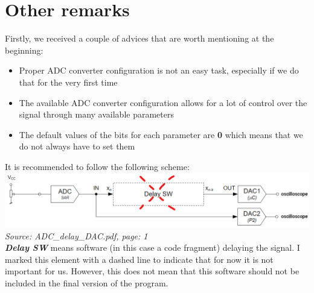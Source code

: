 \documentclass{article}
\begin{document}
\section{Other remarks}
Firstly, we received a couple of advices that are worth mentioning at the beginning:
\begin{itemize}
    \item Proper ADC converter configuration is not an easy task, especially if we do that for the very first time
    \item The available ADC converter configuration allows for a lot of control over the signal through many available parameters
    \item The default values of the bits for each parameter are \textbf{0} which means that we do not always have to set them
\end{itemize}
It is recommended to follow the following scheme:
\vspace{3mm} \\
\includegraphics[width=\textwidth]{"../img/ADC_delay_DAC_eng.png"}
\textit{Source: ADC\_delay\_DAC.pdf, page: 1}
\vspace{3mm} \\
\textbf{\textit{Delay SW}} means software (in this case a code fragment) delaying the signal.
I marked this element with a dashed line to indicate that for now it is not important for us.
However, this does not mean that this software should not be included in the final version of the program.
\end{document}
